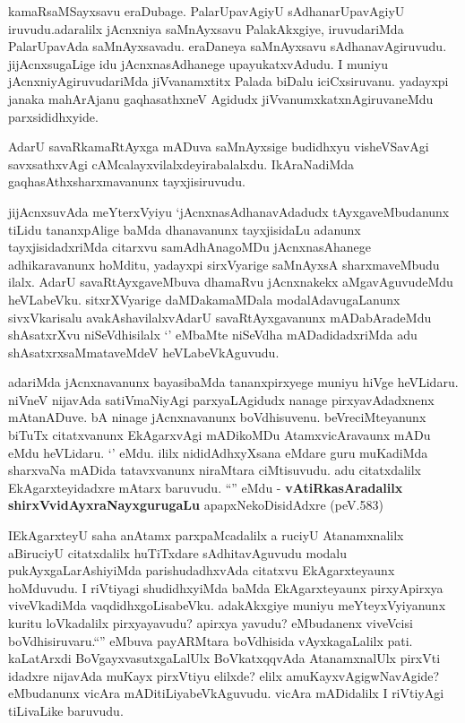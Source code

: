 \begin{artha}

kamaRsaMSayxsavu eraDubage. PalarUpavAgiyU sAdhanarUpavAgiyU
iruvudu.adaralilx jAcnxniya saMnAyxsavu PalakAkxgiye, iruvudariMda
PalarUpavAda saMnAyxsavadu. eraDaneya saMnAyxsavu
sAdhanavAgiruvudu. jijAcnxsugaLige idu jAcnxnasAdhanege
upayukatxvAdudu. I muniyu jAcnxniyAgiruvudariMda jiVvanamxtitx Palada
biDalu iciCxsiruvanu. yadayxpi janaka mahArAjanu gaqhasathxneV Agidudx
jiVvanumxkatxnAgiruvaneMdu parxsididhxyide. 

AdarU savaRkamaRtAyxga mADuva saMnAyxsige budidhxyu visheVSavAgi
savxsathxvAgi cAMcalayxvilalxdeyirabalalxdu. IkAraNadiMda
gaqhasAthxsharxmavanunx tayxjisiruvudu.

jijAcnxsuvAda meYterxVyiyu `jAcnxnasAdhanavAdadudx tAyxgaveMbudanunx
tiLidu tananxpAlige baMda dhanavanunx tayxjisidaLu adanunx
tayxjisidadxriMda citarxvu samAdhAnagoMDu jAcnxnasAhanege
adhikaravanunx hoMditu, yadayxpi sirxVyarige saMnAyxsA sharxmaveMbudu
ilalx. AdarU savaRtAyxgaveMbuva dhamaRvu jAcnxnakekx aMgavAguvudeMdu
heVLabeVku. sitxrXVyarige daMDakamaMDala modalAdavugaLanunx
sivxVkarisalu avakAshavilalxvAdarU savaRtAyxgavanunx mADabAradeMdu
shAsatxrXvu niSeVdhisilalx `\stext' eMbaMte niSeVdha mADadidadxriMda
adu shAsatxrxsaMmataveMdeV heVLabeVkAguvudu.

adariMda  jAcnxnavanunx bayasibaMda tananxpirxyege muniyu hiVge
heVLidaru. niVneV nijavAda satiVmaNiyAgi parxyaLAgidudx nanage
pirxyavAdadxnenx mAtanADuve. bA ninage jAcnxnavanunx
boVdhisuvenu. beVreciMteyanunx biTuTx citatxvanunx EkAgarxvAgi
mADikoMDu AtamxvicAravaunx mADu eMdu heVLidaru. `\stext' eMdu. ililx
nididAdhxyXsana eMdare guru muKadiMda sharxvaNa mADida tatavxvanunx
niraMtara ciMtisuvudu. adu citatxdalilx EkAgarxteyidadxre mAtarx
baruvudu. ``\stext'' eMdu - \textbf{vAtiRkasAradalilx}\textbf{ shirxVvidAyxraNayxgurugaLu} 
apapxNekoDisidAdxre (peV.583)
\end{artha}

\begin{artha}
IEkAgarxteyU saha anAtamx parxpaMcadalilx a ruciyU Atanamxnalilx
aBiruciyU citatxdalilx huTiTxdare sAdhitavAguvudu modalu
pukAyxgaLarAshiyiMda parishudadhxvAda citatxvu EkAgarxteyaunx
hoMduvudu. I riVtiyagi shudidhxyiMda baMda EkAgarxteyaunx
pirxyApirxya viveVkadiMda vaqdidhxgoLisabeVku. adakAkxgiye  muniyu
meYteyxVyiyanunx kuritu loVkadalilx pirxyayavudu? apirxya yavudu?
eMbudanenx viveVcisi boVdhisiruvaru.``\stext'' eMbuva payARMtara
boVdhisida vAyxkagaLalilx pati. kaLatArxdi BoVgayxvasutxgaLalUlx
BoVkatxqqvAda AtanamxnalUlx pirxVti idadxre nijavAda muKayx pirxVtiyu
elilxde? elilx amuKayxvAgigwNavAgide? eMbudanunx vicAra
mADitiLiyabeVkAguvudu. vicAra mADidalilx I riVtiyAgi tiLivaLike baruvudu.
\end{artha}


